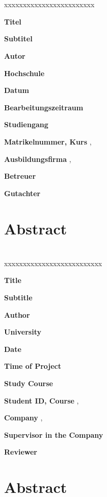 \section*{\reporttype}

\begin{xlist}{xxxxxxxxxxxxxxxxxxxxxxxx} 
  		\item[\textbf{Titel}]        			\reporttitle
		\item[\textbf{Subtitel}]          		\reportsubtitle
		\item[\textbf{Autor}]          			\student
		\item[\textbf{Hochschule}]          	\dhbw
		\item[\textbf{Datum}]          			\handoverdate
		\item[\textbf{Bearbeitungszeitraum}] 	\timerange
		\item[\textbf{Studiengang}]          	\studiengang
		\item[\textbf{Matrikelnummer, Kurs}]  	\matrikel, \kurs
		\item[\textbf{Ausbildungsfirma}]      	\company, \lokation
		\item[\textbf{Betreuer}]   				\tutor
		\item[\textbf{Gutachter}]            	\prof
\end{xlist}
 	
\section*{Abstract}


\clearpage

\section*{\reporttype}

\begin{xlist}{xxxxxxxxxxxxxxxxxxxxxxxxxx} 
  		\item[\textbf{Title}]        			 	\reporttitle
		\item[\textbf{Subtitle}]          		 	\reportsubtitle
		\item[\textbf{Author}]          		 	\student
		\item[\textbf{University}]          	 	\dhbw
		\item[\textbf{Date}]          		 	   	\handoverdate
		\item[\textbf{Time of Project}]             \timerange
		\item[\textbf{Study Course}]          	 	\studiengang
		\item[\textbf{Student ID, Course}]  		\matrikel, \kurs
		\item[\textbf{Company}]      			   	\company, \lokation
		\item[\textbf{Supervisor in the Company}]   \tutor
		\item[\textbf{Reviewer}]            		\prof
\end{xlist}
 	
\section*{Abstract}
